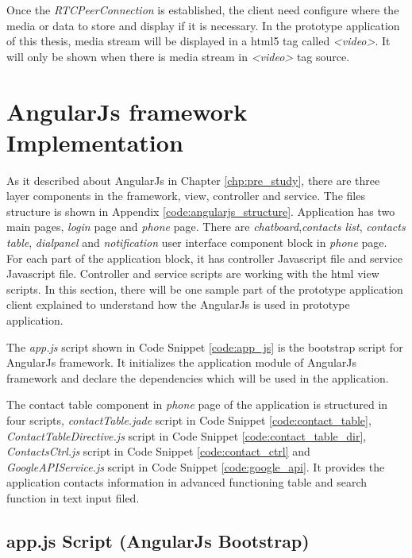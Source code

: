 \par Once the \textit{RTCPeerConnection} is established, the client need configure where the media or data to store and display if it is necessary. In the prototype application of this thesis, media stream will be displayed in a \gls{html5} tag called \textit{<video>}. It will only be shown when there is media stream in \textit{<video>} tag source.

\section{AngularJs framework Implementation}

\noindent As it described about AngularJs in Chapter \ref{chp:pre_study}, there are three layer components in the framework, view, controller and service. The files structure is shown in Appendix \ref{code:angularjs_structure}. Application has two main pages, \textit{login} page and \textit{phone} page. There are \textit{chatboard},\textit{contacts list}, \textit{contacts table}, \textit{dialpanel} and \textit{notification} user interface component block in \textit{phone} page. For each part of the application block, it has controller Javascript file and service Javascript file. Controller and service scripts are working with the \gls{html} view scripts. In this section, there will be one sample part of the prototype application client explained to understand how the AngularJs is used in prototype application.

\par The \textit{app.js} script shown in Code Snippet \ref{code:app_js} is the bootstrap script for AngularJs framework. It initializes the application module of AngularJs framework and declare the dependencies which will be used in the application.

\par The contact table component in \textit{phone} page of the application is structured in four scripts, \textit{contactTable.jade} script in Code Snippet \ref{code:contact_table}, \textit{ContactTableDirective.js} script in Code Snippet \ref{code:contact_table_dir}, \textit{ContactsCtrl.js} script in Code Snippet \ref{code:contact_ctrl} and \textit{GoogleAPIService.js} script in Code Snippet \ref{code:google_api}. It provides the application contacts information in advanced functioning table and search function in text input filed.

\subsection{app.js Script (AngularJs Bootstrap)}

